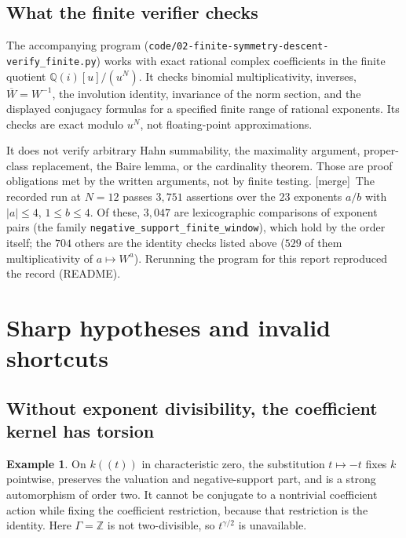 \documentclass[11pt]{article}
\theoremstyle{definition}
\newtheorem{example}[theorem]{Example}
\theoremstyle{remark}
\newcommand{\Q}{\mathbb Q}
\newcommand{\Z}{\mathbb Z}
\newcommand{\mergetag}{\textup{[merge]}}
\numberwithin{equation}{section}
\begin{document}
\subsection{What the finite verifier checks}\label{saut:fs:sec:verifier}

The accompanying program (\texttt{code/02-finite-symmetry-descent-verify\_finite.py})
works with exact rational complex coefficients in the finite quotient
$\Q(i)[u]/(u^N)$. It checks binomial multiplicativity, inverses,
$\overline W=W^{-1}$, the involution identity, invariance of the norm section, and the
displayed conjugacy formulas for a specified finite range of rational exponents. Its
checks are exact modulo $u^N$, not floating-point approximations.

It does not verify arbitrary Hahn summability, the maximality argument, proper-class
replacement, the Baire lemma, or the cardinality theorem. Those are proof obligations
met by the written arguments, not by finite testing. \mergetag\ The recorded run at
$N=12$ passes $3{,}751$ assertions over the $23$ exponents $a/b$ with $|a|\le4$,
$1\le b\le4$. Of these, $3{,}047$ are lexicographic comparisons of exponent pairs
(the family \texttt{negative\_support\_finite\_window}), which hold by the order
itself; the $704$ others are the identity checks listed above ($529$ of them
multiplicativity of $a\mapsto W^a$). Rerunning the program for this report
reproduced the record (README).

\section{Sharp hypotheses and invalid shortcuts}\label{saut:fs:sec:boundaries}

\subsection{Without exponent divisibility, the coefficient kernel has torsion}

\begin{example}\label{saut:fs:ex:nondivisible}
On $k((t))$ in characteristic zero, the substitution $t\mapsto-t$ fixes $k$
pointwise, preserves the valuation and negative-support part, and is a strong
automorphism of order two. It cannot be conjugate to a nontrivial coefficient action
while fixing the coefficient restriction, because that restriction is the identity.
Here $\Gamma=\Z$ is not two-divisible, so $t^{\gamma/2}$ is unavailable.
\end{example}
\end{document}
